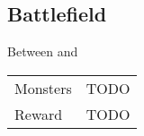 \subsection{Battlefield}
\label{map:battlefield_07}

Between  and 

\begin{longtable}{ l p{9cm} }
	Monsters
	& TODO
\\
	Reward & TODO
\end{longtable}
